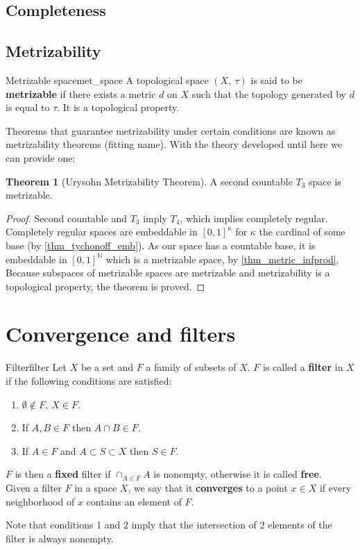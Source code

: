 \documentclass[a4paper]{book}
\theoremstyle{definition}
\newtheorem{theorem}{Theorem}[section]
\theoremstyle{ejemplo}
\theoremstyle{demostracion}
\newcommand{\naturales}{\mathbb{N}}
\begin{document}
\section{Completeness}
\section{Metrizability}
\begin{define}{Metrizable space}{met_space}
	A topological space $(X,\ \tau)$ is said to be \textbf{metrizable} if there exists a metric $d$ on $X$ such that the topology generated by $d$ is equal to $\tau$. It is a topological property.
\end{define}

Theorems that guarantee metrizability under certain conditions are known as metrizability theorems (fitting name). With the theory developed until here we can provide one:

\begin{theorem}[Urysohn Metrizability Theorem]
	A second countable $T_3$ space is metrizable.
\end{theorem}
\begin{proof}
	Second countable and $T_3$ imply $T_4$, which implies completely regular. Completely regular spaces are embeddable in $[0, 1]^{\kappa}$ for $\kappa$ the cardinal of some base (by \eqref{thm_tychonoff_emb}). As our space has a countable base, it is embeddable in $[0, 1]^{\naturales}$ which is a metrizable space, by \eqref{thm_metric_infprod}. Because subspaces of metrizable spaces are metrizable and metrizability is a topological property, the theorem is proved.
\end{proof}




\chapter{Convergence and filters}
\begin{define}{Filter}{filter}
	Let $X$ be a set and $F$ a family of subsets of $X$. $F$ is called a \textbf{filter} in $X$ if the following conditions are satisfied:
	\begin{enumerate}
		\item
		$\emptyset \not \in F,\ X \in F$.
		\item
		If $A,B \in F$ then $A \cap B \in F$.
		\item
		If $A \in F$ and $A \subset S \subset X$ then $S \in F$.
	\end{enumerate}
	$F$ is then a \textbf{fixed} filter if $\cap_{A \in F} A$ is nonempty, otherwise it is called \textbf{free}.\\ 
	Given a filter $F$ in a space $X$, we say that it \textbf{converges} to a point $x \in X$ if every neighborhood of $x$ contains an element of $F$.
\end{define}
Note that conditions 1 and 2 imply that the intersection of 2 elements of the filter is always nonempty.
\end{document}
